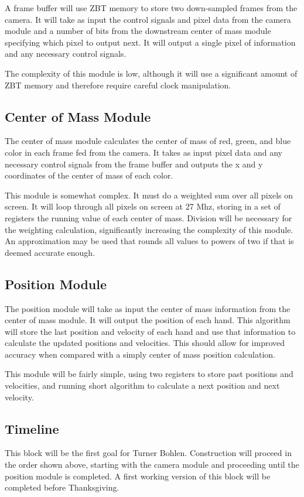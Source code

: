 A frame buffer will use ZBT memory to store two down-sampled frames from the
camera. It will take as input the control signals and pixel data from the camera
module and a number of bits from the downstream center of mass module specifying
which pixel to output next. It will output a single pixel of information and any
necessary control signals.

The complexity of this module is low, although it will use a significant amount
of ZBT memory and therefore require careful clock manipulation.

\subsection{Center of Mass Module}

The center of mass module calculates the center of mass of red, green, and blue
color in each frame fed from the camera. It takes as input pixel data and any
necessary control signals from the frame buffer and outputs the x and y
coordinates of the center of mass of each color.

This module is somewhat complex. It must do a weighted sum over all pixels on
screen. It will loop through all pixels on screen at 27 Mhz, storing in a set of
registers the running value of each center of mass. Division will be necessary
for the weighting calculation, significantly increasing the complexity of this
module. An approximation may be used that rounds all values to powers of two if
that is deemed accurate enough.

\subsection{Position Module}

The position module will take as input the center of mass information from the
center of mass module. It will output the position of each hand. This algorithm
will store the last position and velocity of each hand and use that information
to calculate the updated positions and velocities. This should allow for
improved accuracy when compared with a simply center of mass position
calculation.

This module will be fairly simple, using two registers to store past positions
and velocities, and running short algorithm to calculate a next position and
next velocity.

\subsection{Timeline}

This block will be the first goal for Turner Bohlen. Construction will proceed
in the order shown above, starting with the camera module and proceeding until
the position module is completed. A first working version of this block will be
completed before Thanksgiving.
